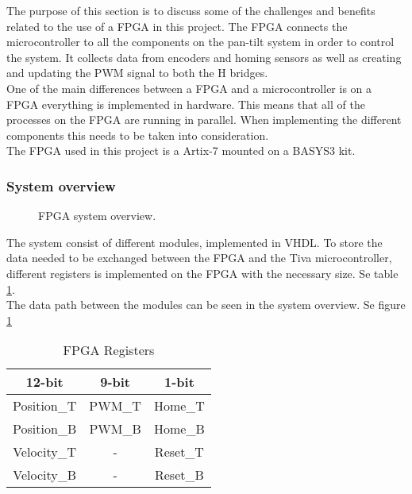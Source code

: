 \documentclass[../../../main]{subfiles}
\begin{document}
The purpose of this section is to discuss some of the challenges and benefits related to the use of a FPGA in this project.
The FPGA connects the microcontroller to all the components on the pan-tilt system in order to control the system. It collects data from encoders and homing sensors as well as creating and updating the PWM signal to both the H bridges.
\\
One of the main differences between a FPGA and a microcontroller is on a FPGA everything is implemented in hardware. This means that all of the processes on the FPGA are running in parallel. When implementing the different components this needs to be taken into consideration. 
\\
The FPGA used in this project is a Artix-7 mounted on a BASYS3 kit. 
\subsubsection{System overview}%
\label{sub:system_overview}

\begin{figure}[H]
  \centering
  \def\svgwidth{\textwidth}
  
  \caption{FPGA system overview.}
  \label{fig:FPGA_system_overview}
\end{figure}

The system consist of different modules, implemented in VHDL.
To store the data needed to be exchanged between the FPGA and the Tiva microcontroller, different registers is implemented on the FPGA with the necessary size. Se table \ref{table:FPGA_registers}. 
\\
The data path between the modules can be seen in the system overview. Se figure \ref{fig:FPGA_system_overview}
\begin{table}[H]
\centering
\begin{tabular}{|c|c|c|}
\hline
\textbf{12-bit} & \textbf{9-bit} & \textbf{1-bit} \\ \hline
Position\_T     & PWM\_T         & Home\_T        \\ \hline
Position\_B     & PWM\_B         & Home\_B        \\ \hline
Velocity\_T     & -              & Reset\_T       \\ \hline
Velocity\_B     & -              & Reset\_B       \\ \hline
\end{tabular}
\caption{FPGA Registers}
\label{table:FPGA_registers}
\end{table}
\end{document}
